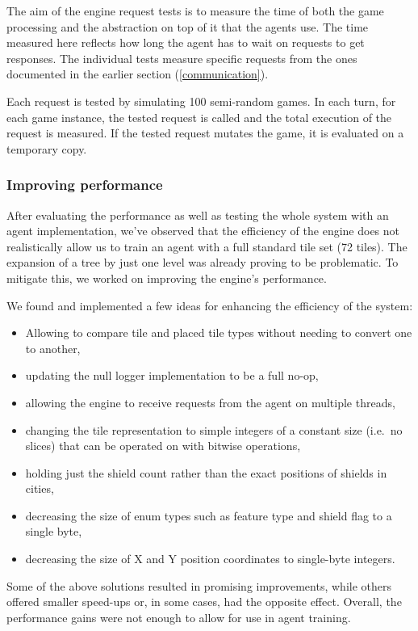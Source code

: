 The aim of the engine request tests is to measure the time of both the game processing
and the abstraction on top of it that the agents use. The time measured here reflects
how long the agent has to wait on requests to get responses. The individual tests measure
specific requests from the ones documented in the earlier section (\ref{communication}).

Each request is tested by simulating 100 semi-random games. In each turn, for each game instance,
the tested request is called and the total execution of the request is measured.
If the tested request mutates the game, it is evaluated on a temporary copy.

\subsubsection{Improving performance}

After evaluating the performance as well as testing the whole system with
an agent implementation, we've observed that the efficiency of the engine does not
realistically allow us to train an agent with a full standard tile set (72 tiles).
The expansion of a tree by just one level was already proving to be problematic.
To mitigate this, we worked on improving the engine's performance.

We found and implemented a few ideas for enhancing the efficiency of the system:
\begin{itemize}
	\item Allowing to compare tile and placed tile types without needing to convert one to another,
    \item updating the null logger implementation to be a full no-op,
    \item allowing the engine to receive requests from the agent on multiple threads,
    \item changing the tile representation to simple integers of a constant size (i.e.\ no slices)
          that can be operated on with bitwise operations,
    \item holding just the shield count rather than the exact positions of shields in cities,
    \item decreasing the size of enum types such as feature type and shield flag to a single byte,
    \item decreasing the size of X and Y position coordinates to single-byte integers.
\end{itemize}
Some of the above solutions resulted in promising improvements,
while others offered smaller speed-ups or, in some cases, had the opposite effect.
Overall, the performance gains were not enough to allow for use in agent training.
